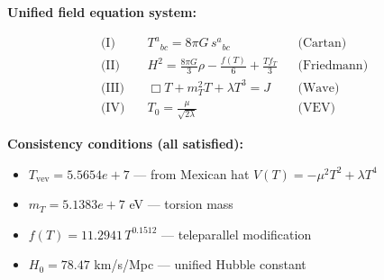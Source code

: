 
\textbf{Unified field equation system:}

\begin{align}
  \text{(I)} \quad & T^a{}_{bc} = 8\pi G \, s^a{}_{bc} && \text{(Cartan)} \\
  \text{(II)} \quad & H^2 = \frac{8\pi G}{3}\rho - \frac{f(T)}{6} + \frac{Tf_T}{3} && \text{(Friedmann)} \\
  \text{(III)} \quad & \Box T + m_T^2 T + \lambda T^3 = J && \text{(Wave)} \\
  \text{(IV)} \quad & T_0 = \frac{\mu}{\sqrt{2\lambda}} && \text{(VEV)}
\end{align}

\textbf{Consistency conditions (all satisfied):}
\begin{itemize}
  \item $T_{\text{vev}} = 5.5654e+7$ — from Mexican hat $V(T) = -\mu^2 T^2 + \lambda T^4$
  \item $m_T = 5.1383e+7$ eV — torsion mass
  \item $f(T) = 11.2941 \, T^{0.1512}$ — teleparallel modification
  \item $H_0 = 78.47$ km/s/Mpc — unified Hubble constant
\end{itemize}